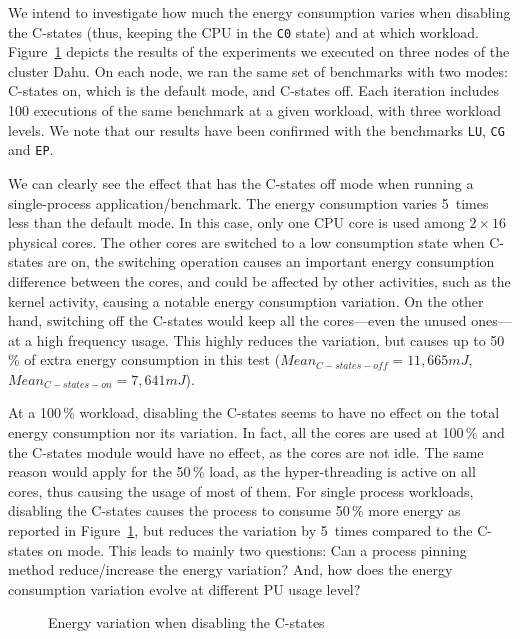 We intend to investigate how much the energy consumption varies when disabling the C-states (thus, keeping the CPU in the \texttt{C0} state) and at which workload.
Figure~\ref{fig:c-states} depicts the results of the experiments we executed on three nodes of the cluster \textsf{Dahu}.
On each node, we ran the same set of benchmarks with two modes: \textsf{C-states on}, which is the default mode, and \textsf{C-states off}.
Each iteration includes 100 executions of the same benchmark at a given workload, with three workload levels.
We note that our results have been confirmed with the benchmarks \texttt{LU}, \texttt{CG} and \texttt{EP}.

We can clearly see the effect that has the \textsf{C-states off} mode when running a single-process application/benchmark.
The energy consumption varies 5~times less than the default mode.
In this case, only one CPU core is used among $2\times16$ physical cores.
The other cores are switched to a low consumption state when C-states are on, the switching operation causes an important energy consumption difference between the cores, and could be affected by other activities, such as the kernel activity, causing a notable energy consumption variation.
On the other hand, switching off the C-states would keep all the cores---even the unused ones---at a high frequency usage.
This highly reduces the variation, but causes up to 50\,\% of extra energy consumption in this test ($Mean_{C-states-off}=11,665 mJ$,$Mean_{C-states-on}=7,641 mJ$).

At a 100\,\% workload, disabling the C-states seems to have no effect on the total energy consumption nor its variation.
In fact, all the cores are used at 100\,\% and the C-states module would have no effect, as the cores are not idle.
The same reason would apply for the 50\,\% load, as the hyper-threading is active on all cores, thus causing the usage of most of them.
For single process workloads, disabling the C-states causes the process to consume 50\,\% more energy as reported in Figure~\ref{fig:c-states}, but reduces the variation by 5~times compared to the \textsf{C-states on} mode.
This leads to mainly two questions: Can a process pinning method reduce/increase the energy variation? And, how does the energy consumption variation evolve at different PU usage level?

\begin{figure}
    \caption{Energy variation when disabling the C-states}\label{fig:c-states}
\end{figure}

